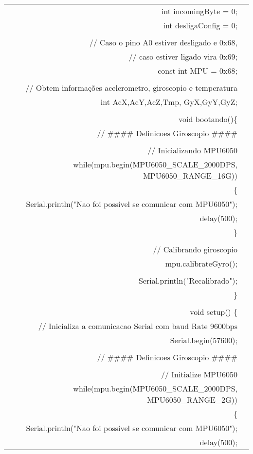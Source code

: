 \begin{longtable}{Rp{15cm}}
int incomingByte = 0; \\
int desligaConfig = 0; \\
\\
// Caso o pino A0 estiver desligado e 0x68, \\
// caso estiver ligado vira 0x69; \\
const int MPU = 0x68; \\
\\
// Obtem informações acelerometro, giroscopio e temperatura \\
int AcX,AcY,AcZ,Tmp, GyX,GyY,GyZ; \\
\\
void bootando()\{ \\
\qquad  // \#\#\#\# Definicoes Giroscopio \#\#\#\# \\
\\
 \qquad // Inicializando  MPU6050 \\
 \qquad while(\!mpu.begin(MPU6050\_SCALE\_2000DPS, MPU6050\_RANGE\_16G)) \\
 \qquad \{ \\
  \qquad \qquad  Serial.println("Nao foi possivel se comunicar com MPU6050"); \\
   \qquad \qquad delay(500); \\
  \qquad \} \\
  \\
  \qquad // Calibrando giroscopio \\
  \qquad mpu.calibrateGyro(); \\
\\
  \qquad Serial.println("Recalibrado");\\
\} \\
\\
void setup() \{ \\
\qquad  // Inicializa a comunicacao Serial com baud Rate 9600bps \\
\qquad  Serial.begin(57600); \\
  \\
\qquad  // \#\#\#\# Definicoes Giroscopio \#\#\#\# \\
  \\
 \qquad // Initialize MPU6050\\
 \qquad while(\!mpu.begin(MPU6050\_SCALE\_2000DPS, MPU6050\_RANGE\_2G))\\
 \qquad \{\\
   \qquad \qquad Serial.println("Nao foi possivel se comunicar com MPU6050");\\
   \qquad \qquad delay(500);\\

\end{longtable}

